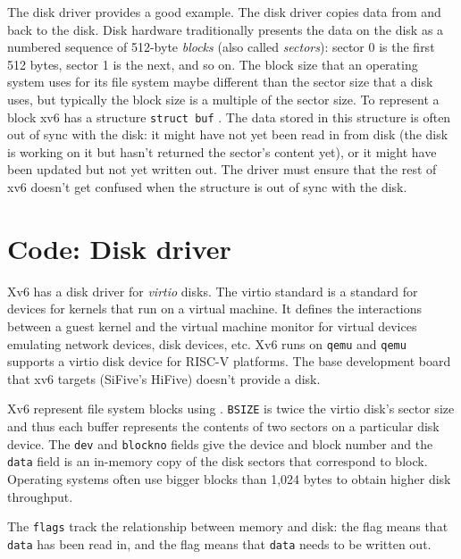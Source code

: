 The disk driver provides a good example.  The disk driver copies data
from and back to the disk.  Disk hardware traditionally presents the data on the
disk as a numbered sequence of 512-byte 
\textit{blocks} 
(also called 
\textit{sectors}): 
sector 0 is the first 512 bytes, sector 1 is the next, and so on. The block size
that an operating system uses for its file system maybe different than the
sector size that a disk uses, but typically the block size is a multiple of the
sector size. To
represent a block xv6 has a structure
\lstinline{struct buf}
.
The
data stored in this structure is often out of sync with the disk: it might have
not yet been read in from disk (the disk is working on it but hasn't returned
the sector's content yet), or it might have been updated but not yet written
out.  The driver must ensure that the rest of xv6 doesn't get confused when the
structure is out of sync with the disk.

\section{Code: Disk driver}

Xv6 has a disk driver for \textit{virtio} disks. The
virtio standard is a standard for devices for kernels that run on a
virtual machine.  It defines the interactions between a guest kernel
and the virtual machine monitor for virtual devices emulating network
devices, disk devices, etc.  Xv6 runs on \texttt{qemu} and
\texttt{qemu} supports a virtio disk device for RISC-V platforms.  The
base development board that xv6 targets (SiFive's HiFive) doesn't
provide a disk.

Xv6 represent file system blocks using
.
\lstinline{BSIZE}
is twice the virtio disk's sector size and thus
each buffer represents the contents of two sectors on a particular
disk device.  The
\lstinline{dev}
and
\lstinline{blockno}
fields give the device and block
number and the
\lstinline{data}
field is an in-memory copy of the disk sectors that correspond to block.
Operating systems often use
bigger blocks than 1,024 bytes to obtain higher disk throughput.

The
\lstinline{flags}
track the relationship between memory and disk:
the
flag means that
\lstinline{data}
has been read in, and
the 
flag means that
\lstinline{data}
needs to be written out.


